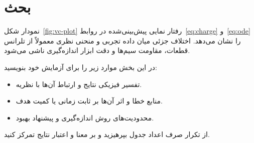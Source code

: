 \section{بحث}

نمودار شکل~\ref{fig:vc-plot} رفتار نمایی پیش‌بینی‌شده در روابط~\eqref{eq:charge} و~\eqref{eq:ode} را نشان می‌دهد.
اختلاف جزئی میان داده تجربی و منحنی نظری معمولاً از تلرانس قطعات، مقاومت سیم‌ها و دقت ابزار اندازه‌گیری ناشی می‌شود.

در این بخش موارد زیر را برای آزمایش خود بنویسید:
\begin{itemize}
  \item تفسیر فیزیکی نتایج و ارتباط آن‌ها با نظریه.
  \item منابع خطا و اثر آن‌ها بر ثابت زمانی یا کمیت هدف.
  \item محدودیت‌های روش اندازه‌گیری و پیشنهاد بهبود.
\end{itemize}
از تکرار صرف اعداد جدول بپرهیزید و بر معنا و اعتبار نتایج تمرکز کنید.
